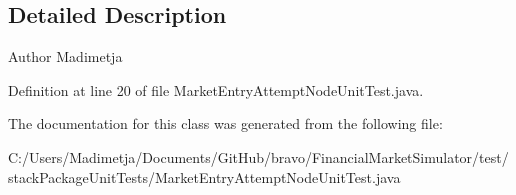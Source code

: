 \subsection{Detailed Description}
\begin{DoxyAuthor}{Author}
Madimetja 
\end{DoxyAuthor}


Definition at line 20 of file Market\+Entry\+Attempt\+Node\+Unit\+Test.\+java.



The documentation for this class was generated from the following file\+:\begin{DoxyCompactItemize}
\item 
C\+:/\+Users/\+Madimetja/\+Documents/\+Git\+Hub/bravo/\+Financial\+Market\+Simulator/test/stack\+Package\+Unit\+Tests/Market\+Entry\+Attempt\+Node\+Unit\+Test.\+java\end{DoxyCompactItemize}
